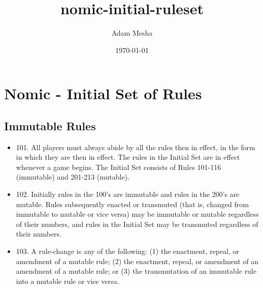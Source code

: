 \documentclass[11pt]{article}
\title{nomic-initial-ruleset}
\author{Adam Mesha}
\date{\today}
\begin{document}
\maketitle

\setcounter{tocdepth}{3}
\tableofcontents
\vspace*{1cm}
\section{Nomic - Initial Set of Rules}
\label{sec-1}
\subsection{Immutable Rules}
\label{sec-1-1}

\begin{itemize}
\item 101. All players must always abide by all the rules then in
     effect, in the form in which they are then in effect. The rules
     in the Initial Set are in effect whenever a game begins. The
     Initial Set consists of Rules 101-116 (immutable) and 201-213
     (mutable).
\item 102. Initially rules in the 100's are immutable and rules in the
     200's are mutable. Rules subsequently enacted or transmuted (that
     is, changed from immutable to mutable or vice versa) may be
     immutable or mutable regardless of their numbers, and rules in
     the Initial Set may be transmuted regardless of their numbers.
\item 103. A rule-change is any of the following: (1) the enactment,
     repeal, or amendment of a mutable rule; (2) the enactment,
     repeal, or amendment of an amendment of a mutable rule; or (3)
     the transmutation of an immutable rule into a mutable rule or
     vice versa.


\end{itemize}
\end{document}
